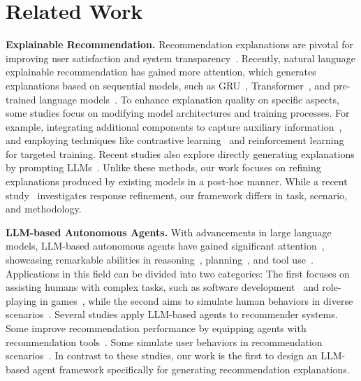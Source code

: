 \section{Related Work}
\label{sec:related_work}

\textbf{Explainable Recommendation.}
Recommendation explanations are pivotal for improving user satisfaction and system transparency~\cite{zhang2020explainable}. 
Recently, natural language explainable recommendation has gained more attention, which generates explanations based on sequential models, such as GRU~\cite{li2020generate}, Transformer~\cite{li2021personalized}, and pre-trained language models~\cite{li2023personalized}.
To enhance explanation quality on specific aspects, some studies focus on modifying model architectures and training processes.
For example, integrating additional components to capture auxiliary information~\cite{cheng2023explainable,zhou2024enhancing},  
and employing techniques like contrastive learning~\cite{zhuang2024improving} and reinforcement learning~\cite{yang2024fine} for targeted training.
Recent studies also explore directly generating explanations by prompting LLMs~\cite{luo2023unlocking,raczynski2023problem,lei2024recexplainer}.
Unlike these methods, our work focuses on refining explanations produced by existing models in a post-hoc manner. 
While a recent study~\cite{qin2024beyond} investigates response refinement, our framework differs in task, scenario, and methodology.

\textbf{LLM-based Autonomous Agents.}
With advancements in large language models, LLM-based autonomous agents have gained significant attention~\cite{wang2024survey}, showcasing remarkable abilities in reasoning~\cite{yao2022react}, planning~\cite{shinn2024reflexion}, and tool use~\cite{schick2024toolformer}. 
Applications in this field can be divided into two categories:
The first focuses on assisting humans with complex tasks, such as software development~\cite{qian2023communicative} and role-playing in games~\cite{wang2023voyager}, while the second aims to simulate human behaviors in diverse scenarios~\cite{park2023generative,gao2023s,liu2023training}.
Several studies apply LLM-based agents to recommender systems.
Some improve recommendation performance by equipping agents with recommendation tools~\cite{huang2023recommender, zhang2024agentcf, wang2023recmind}.
Some simulate user behaviors in recommendation scenarios~\cite{zhang2024generative,wang2023user}.
In contrast to these studies, our work is the first to design an LLM-based agent framework specifically for generating recommendation explanations.